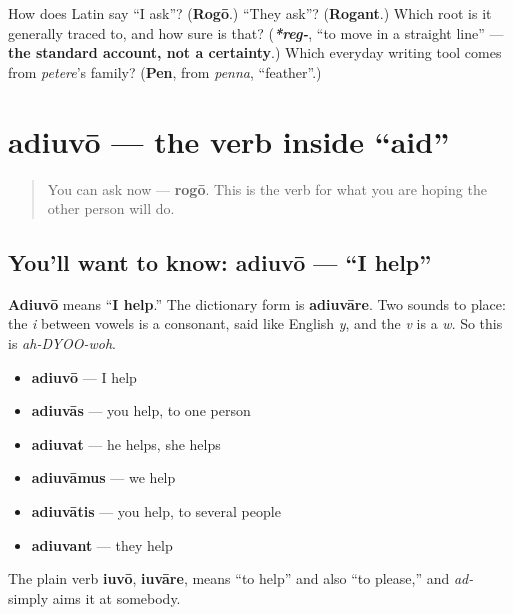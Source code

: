 \begin{tcolorbox}[breakable,colback=teal!4,colframe=teal!35!black,title={Before you move on}]
How does Latin say \textquotedblleft{}I ask\textquotedblright{}? (\textbf{Rogō}.) \textquotedblleft{}They ask\textquotedblright{}? (\textbf{Rogant}.) Which root is it generally traced to, and how sure is that? (\emph{\textbf{*reg-}}, \textquotedblleft{}to move in a straight line\textquotedblright{} — \textbf{the standard account, not a certainty}.) Which everyday writing tool comes from \emph{petere}'s family? (\textbf{Pen}, from \emph{penna}, \textquotedblleft{}feather\textquotedblright{}.)
\end{tcolorbox}
\section[adiuvō, adiuvāre]{adiuvō — the verb inside \textquotedblleft{}aid\textquotedblright{}}

\label{lesson:LA-C38-adiuvo}



\begin{quote}
You can ask now — \textbf{rogō}. This is the verb for what you are hoping the other person will do.
\end{quote}

\subsection*{You'll want to know: adiuvō — \textquotedblleft{}I help\textquotedblright{}}
\textbf{Adiuvō} means \textquotedblleft{}\textbf{I help}.\textquotedblright{} The dictionary form is \textbf{adiuvāre}. Two sounds to place: the \emph{i} between vowels is a consonant, said like English \emph{y}, and the \emph{v} is a \emph{w}. So this is \emph{ah-DYOO-woh}.

\begin{itemize}
\raggedright
  \item \textbf{adiuvō} — I help
  \item \textbf{adiuvās} — you help, to one person
  \item \textbf{adiuvat} — he helps, she helps
  \item \textbf{adiuvāmus} — we help
  \item \textbf{adiuvātis} — you help, to several people
  \item \textbf{adiuvant} — they help
\end{itemize}

The plain verb \textbf{iuvō}, \textbf{iuvāre}, means \textquotedblleft{}to help\textquotedblright{} and also \textquotedblleft{}to please,\textquotedblright{} and \emph{ad-} simply aims it at somebody.

